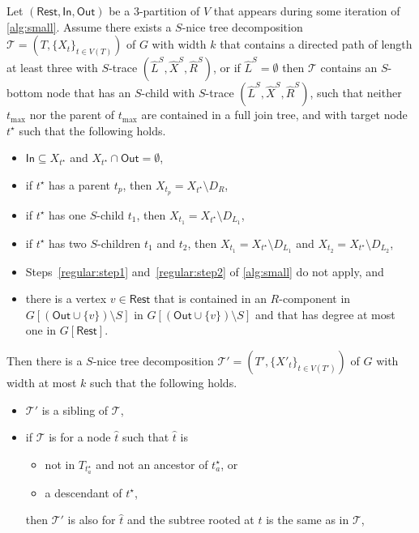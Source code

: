 \documentclass[a4paper,UKenglish,cleveref, autoref, thm-restate, numberwithinsect]{lipics-v2021}
\newcommand{\slim}{\text{slim}\xspace}
\newcommand{\topheavy}{\text{top-heavy}\xspace}
\newcommand{\In}{\mathsf{In}}
\newcommand{\Out}{\mathsf{Out}}
\newcommand{\Rest}{\mathsf{Rest}}
\begin{document}
\begin{lemma}\label{lem:regularstep3}
Let $(\Rest,\In,\Out)$ be a 3-partition of $V$ that appears during some iteration of \cref{alg:small}. 
Assume there exists a \slim $S$-nice tree decomposition $\mathcal{T}=(T,\{X_t\}_{t\in V(T)})$ of $G$ with width $k$ that contains a directed path of length at least three with $S$-trace $(\hat{L}^S, \hat{X}^S, \hat{R}^S)$, or if $\hat{L}^S=\emptyset$ then $\mathcal{T}$ contains an $S$-bottom node that has an $S$-child with $S$-trace $(\hat{L}^S, \hat{X}^S, \hat{R}^S)$, such that neither $t_{\max}$ nor the parent of $t_{\max}$ are contained in a full join tree, and with target node ${t^\star}$ such that the following holds.
\begin{itemize}
\item $\In\subseteq X_{t^\star}$ and $X_{t^\star}\cap \Out=\emptyset$, 
        \item if $t^\star$ has a parent $t_p$, then $X_{t_p}=X_{t^\star}\setminus D_R$, 
    \item if $t^\star$ has one $S$-child $t_1$, then $X_{t_1}=X_{t^\star}\setminus D_{L_1}$, 
    \item if $t^\star$ has two $S$-children $t_1$ and $t_2$, then $X_{t_1}=X_{t^\star}\setminus D_{L_1}$ and $X_{t_2}=X_{t^\star}\setminus D_{L_2}$,
    \item Steps~\ref{regular:step1} and~\ref{regular:step2} of \cref{alg:small} do not apply, and
    \item there is a vertex $v\in\Rest$ that is contained in an $R$-component in $G[(\Out\cup\{v\})\setminus S]$ in $G[(\Out\cup\{v\})\setminus S]$ and that has degree at most one in $G[\Rest]$.
\end{itemize} 
Then there is a \slim $S$-nice tree decomposition $\mathcal{T}'=(T',\{X'_t\}_{t\in V(T')})$ of $G$ with width at most $k$ 
such that the following holds.
\begin{itemize}
\item $\mathcal{T}'$ is a sibling of $\mathcal{T}$,
\item if $\mathcal{T}$ is \topheavy for a node $\hat{t}$ such that $\hat{t}$ is
\begin{itemize}
    \item not in $T_{t^\star_a}$ and not an ancestor of $t^\star_a$, or
    \item a descendant of $t^\star$,
\end{itemize}
then $\mathcal{T}'$ is also \topheavy for $\hat{t}$ and the subtree rooted at $\hat{t}$ is the same as in $\mathcal{T}$,

\end{itemize}
\end{lemma}
\end{document}
